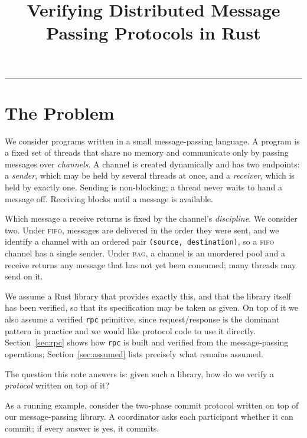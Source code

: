 \documentclass[11pt]{article}
\title{\vspace{-2.2em}\sffamily\bfseries Verifying Distributed Message Passing Protocols in Rust\vspace{-0.5em}}
\author{}
\date{}
\newcommand{\code}[1]{\texttt{#1}}
\begin{document}
\maketitle
\vspace{-3.5em}


\vspace{1.2em}
\noindent\textcolor{rulegrey}{\rule{\linewidth}{0.4pt}}


\section{The Problem}\label{sec:2pc}

We consider programs written in a small message-passing language. A program is a
fixed set of threads that share no memory and communicate only by passing
messages over \emph{channels}. A channel is created dynamically and has two
endpoints: a \emph{sender}, which may be held by several threads at once, and a
\emph{receiver}, which is held by exactly one. Sending is non-blocking; a thread
never waits to hand a message off. Receiving blocks until a message is
available.

Which message a receive returns is fixed by the channel's \emph{discipline}. We
consider two. Under \textsc{fifo}, messages are delivered in the order they were
sent, and we identify a channel with an ordered pair
\code{(source, destination)}, so a \textsc{fifo} channel has a single sender.
Under \textsc{bag}, a channel is an unordered pool and a receive returns any
message that has not yet been consumed; many threads may send on it.

We assume a Rust library that provides exactly this, and that the library itself
has been verified, so that its specification may be taken as given. On top of
it we also assume a verified \code{rpc} primitive, since request/response is the
dominant pattern in practice and we would like protocol code to use it directly.
Section~\ref{sec:rpc} shows how \code{rpc} is built and verified from the
message-passing operations; Section~\ref{sec:assumed} lists precisely what
remains assumed.

The question this note answers is: given such a library, how do we verify a
\emph{protocol} written on top of it?

As a running example, consider the two-phase commit protocol written on top of our message-passing
library. A
coordinator asks each participant whether it can commit; if every answer is yes,
it commits.
\end{document}
